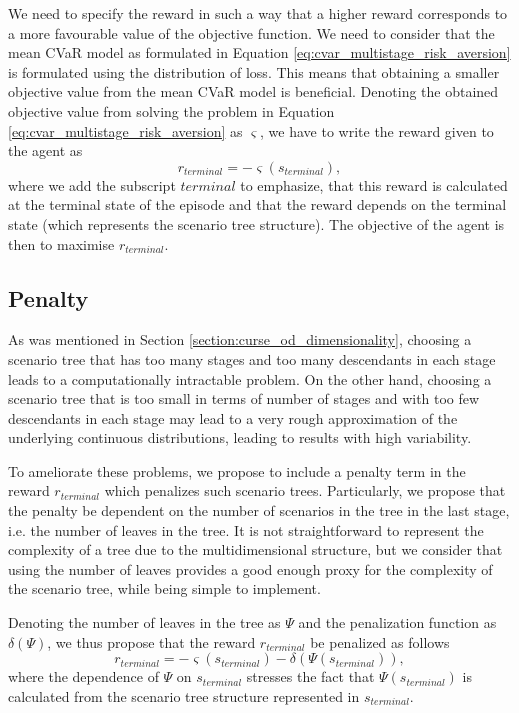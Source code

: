We need to specify the reward in such a way that a higher reward corresponds to a more favourable value of the objective function. We need to consider that the mean CVaR model as formulated in Equation \ref{eq:cvar_multistage_risk_aversion} is formulated using the distribution of loss. This means that obtaining a smaller objective value from the mean CVaR model is beneficial. Denoting the obtained objective value from solving the problem in Equation \ref{eq:cvar_multistage_risk_aversion} as $\varsigma$, we have to write the reward given to the agent as
\begin{equation*}
r_{terminal} = -\varsigma(s_{terminal}),
\end{equation*}
where we add the subscript $terminal$ to emphasize, that this reward is calculated at the terminal state of the episode and that the reward depends on the terminal state (which represents the scenario tree structure). The objective of the agent is then to maximise $r_{terminal}$.

\subsection{Penalty}
As was mentioned in Section \ref{section:curse_od_dimensionality}, choosing a scenario tree that has too many stages and too many descendants in each stage leads to a computationally intractable problem. On the other hand, choosing a scenario tree that is too small in terms of number of stages and with too few descendants in each stage may lead to a very rough approximation of the underlying continuous distributions, leading to results with high variability. 

To ameliorate these problems, we propose to include a penalty term in the reward $r_{terminal}$ which penalizes such scenario trees. Particularly, we propose that the penalty be dependent on the number of scenarios in the tree in the last stage, i.e. the number of leaves in the tree. It is not straightforward to represent the complexity of a tree due to the multidimensional structure, but we consider that using the number of leaves provides a good enough proxy for the complexity of the scenario tree, while being simple to implement. 

Denoting the number of leaves in the tree as $\Psi$ and the penalization function as $\delta(\Psi)$, we thus propose that the reward $r_{terminal}$ be penalized as follows
\begin{equation*}
r_{terminal} = -\varsigma(s_{terminal}) - \delta(\Psi(s_{terminal})),
\end{equation*}
where the dependence of $\Psi$ on $s_{terminal}$ stresses the fact that $\Psi(s_{terminal})$ is calculated from the scenario tree structure represented in $s_{terminal}$.

